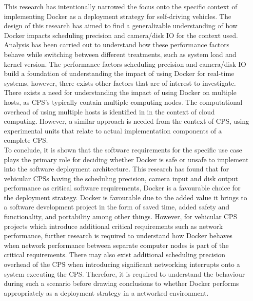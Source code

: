 This research has intentionally narrowed the focus onto the specific context of implementing Docker as a deployment strategy for self-driving vehicles. The design of this research has aimed to find a generalizable understanding of how Docker impacts scheduling precision and camera/disk IO for the context used. Analysis has been carried out to understand how these performance factors behave while switching between different treatments, such as system load and kernel version. The performance factors scheduling precision and camera/disk IO build a foundation of understanding the impact of using Docker for real-time systems, however, there exists other factors that are of interest to investigate. There exists a need for understanding the impact of using Docker on multiple hosts, as CPS's typically contain multiple computing nodes. The computational overhead of using multiple hosts is identified in \cite{p1} in the context of cloud computing. However, a similar approach is needed from the context of CPS, using experimental units that relate to actual implementation components of a complete CPS.\\

To conclude, it is shown that the software requirements for the specific use case plays the primary role for deciding whether Docker is safe or unsafe to implement into the software deployment architecture. This research has found that for vehicular CPSs having the scheduling precision, camera input and disk output performance as critical software requirements, Docker is a favourable choice for the deployment strategy. Docker is favourable due to the added value it brings to a software development project in the form of saved time, added safety and functionality, and portability among other things. However, for vehicular CPS projects which introduce additional critical requirements such as network performance, further research is required to understand how Docker behaves when network performance between separate computer nodes is part of the critical requirements. There may also exist additional scheduling precision overhead of the CPS when introducing significant networking interrupts onto a system executing the CPS. Therefore, it is required to understand the behaviour during such a scenario before drawing conclusions to whether Docker performs appropriately as a deployment strategy in a networked environment.






